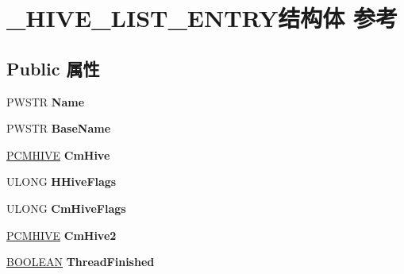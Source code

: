 \hypertarget{struct___h_i_v_e___l_i_s_t___e_n_t_r_y}{}\section{\+\_\+\+H\+I\+V\+E\+\_\+\+L\+I\+S\+T\+\_\+\+E\+N\+T\+R\+Y结构体 参考}
\label{struct___h_i_v_e___l_i_s_t___e_n_t_r_y}
\subsection*{Public 属性}
\begin{DoxyCompactItemize}
\item 
\mbox{\label{struct___h_i_v_e___l_i_s_t___e_n_t_r_y_a4187284ba59cd8a82ff33a43d97ae6fa}} 
P\+W\+S\+TR {\bfseries Name}
\item 
\mbox{\label{struct___h_i_v_e___l_i_s_t___e_n_t_r_y_a4ea3c4799c117a257ffaa8c6d3020c6b}} 
P\+W\+S\+TR {\bfseries Base\+Name}
\item 
\mbox{\label{struct___h_i_v_e___l_i_s_t___e_n_t_r_y_a2fbe1c14998f1374a16216cc1425f9a6}} 
\hyperlink{struct___c_m_h_i_v_e}{P\+C\+M\+H\+I\+VE} {\bfseries Cm\+Hive}
\item 
\mbox{\label{struct___h_i_v_e___l_i_s_t___e_n_t_r_y_a7e0ddcdf668f3a2b87ba7fb697b27108}} 
U\+L\+O\+NG {\bfseries H\+Hive\+Flags}
\item 
\mbox{\label{struct___h_i_v_e___l_i_s_t___e_n_t_r_y_ad2b51581ae2bddb42f11993159e928cc}} 
U\+L\+O\+NG {\bfseries Cm\+Hive\+Flags}
\item 
\mbox{\label{struct___h_i_v_e___l_i_s_t___e_n_t_r_y_a54ffca44a19935781b5d8af34c4f814c}} 
\hyperlink{struct___c_m_h_i_v_e}{P\+C\+M\+H\+I\+VE} {\bfseries Cm\+Hive2}
\item 
\mbox{\label{struct___h_i_v_e___l_i_s_t___e_n_t_r_y_a7261591cfd4f3658dbb2829a84c4f94c}} 
\hyperlink{_processor_bind_8h_a112e3146cb38b6ee95e64d85842e380a}{B\+O\+O\+L\+E\+AN} {\bfseries Thread\+Finished}

\end{DoxyCompactItemize}

